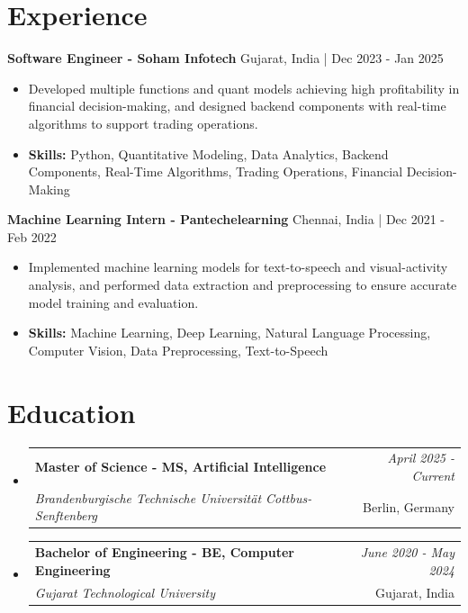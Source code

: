 \documentclass[a4paper,11pt]{article}
\makeatletter
\newcommand{\resumeSubheading}[4]{
\vspace{0.5mm}\item
    \begin{tabular*}{\linewidth}[t]{l@{\extracolsep{\fill}}r}
        \textbf{#1} & \textit{\footnotesize{#4}} \\
        \textit{\footnotesize{#3}} &  \footnotesize{#2}\\
    \end{tabular*}
    \vspace{-2.4mm}
}
\makeatother
\begin{document}
\section{\textbf{Experience}}


\vspace{1mm}
  \textbf{Software Engineer - Soham Infotech} \hfill Gujarat, India | Dec 2023 - Jan 2025
\vspace{-1.5mm} %
\begin{itemize}
  \item Developed multiple functions and quant models achieving high profitability in financial decision-making, and designed backend components with real-time algorithms to support trading operations.

\vspace{-2mm}
  \item \textbf{Skills:} Python, Quantitative Modeling, Data Analytics, Backend Components, Real-Time Algorithms, Trading Operations, Financial Decision-Making
\end{itemize}

\vspace{1mm}
  \textbf{Machine Learning Intern - Pantechelearning} \hfill Chennai, India | Dec 2021 - Feb 2022
\vspace{-1.5mm} %
\begin{itemize}
  \item Implemented machine learning models for text-to-speech and visual-activity analysis, and performed data extraction and preprocessing to ensure accurate model training and evaluation.
\vspace{-2mm}
  \item \textbf{Skills:} Machine Learning, Deep Learning, Natural Language Processing, Computer Vision, Data Preprocessing, Text-to-Speech
\end{itemize}\section{\textbf{Education}}
\vspace{-0.4mm}

\begin{itemize}[leftmargin=0.15in, label={}]
\resumeSubheading
{Master of Science - MS, Artificial Intelligence }{Berlin, Germany}
{Brandenburgische Technische Universität Cottbus-Senftenberg  }{April 2025 - Current}

\vspace{1.0mm} %
\resumeSubheading
{Bachelor of Engineering - BE, Computer Engineering  }{Gujarat, India}
{Gujarat Technological University }{June 2020 - May 2024}

\end{itemize}
\end{document}
